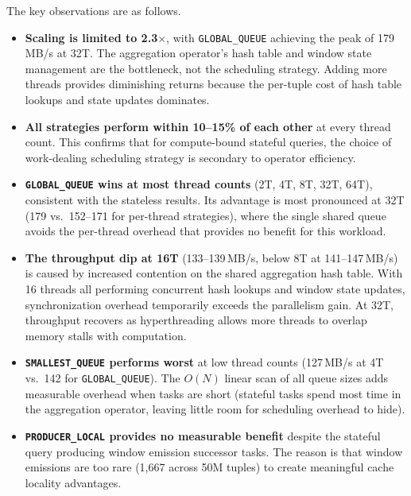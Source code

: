The key observations are as follows.
% 
\begin{itemize}
    \item \textbf{Scaling is limited to 2.3$\times$}, with \texttt{GLOBAL\_QUEUE} achieving the peak of 179\,MB/s at 32T.
    The aggregation operator's hash table and window state management are the bottleneck, not the scheduling strategy.
    Adding more threads provides diminishing returns because the per-tuple cost of hash table lookups and state updates dominates.

    \item \textbf{All strategies perform within 10--15\% of each other} at every thread count.
    This confirms that for compute-bound stateful queries, the choice of work-dealing scheduling strategy is secondary to operator efficiency.

    \item \textbf{\texttt{GLOBAL\_QUEUE} wins at most thread counts} (2T, 4T, 8T, 32T, 64T), consistent with the stateless results.
    Its advantage is most pronounced at 32T (179 vs.\ 152--171 for per-thread strategies), where the single shared queue avoids the per-thread overhead that provides no benefit for this workload.

    \item \textbf{The throughput dip at 16T} (133--139\,MB/s, below 8T at 141--147\,MB/s) is caused by increased contention on the shared aggregation hash table.
    With 16 threads all performing concurrent hash lookups and window state updates, synchronization overhead temporarily exceeds the parallelism gain.
    At 32T, throughput recovers as hyperthreading allows more threads to overlap memory stalls with computation.

    \item \textbf{\texttt{SMALLEST\_QUEUE} performs worst} at low thread counts (127\,MB/s at 4T vs.\ 142 for \texttt{GLOBAL\_QUEUE}).
    The $O(N)$ linear scan of all queue sizes adds measurable overhead when tasks are short (stateful tasks spend most time in the aggregation operator, leaving little room for scheduling overhead to hide).

    \item \textbf{\texttt{PRODUCER\_LOCAL} provides no measurable benefit} despite the stateful query producing window emission successor tasks.
    The reason is that window emissions are too rare (1,667 across 50M tuples) to create meaningful cache locality advantages.
\end{itemize}

